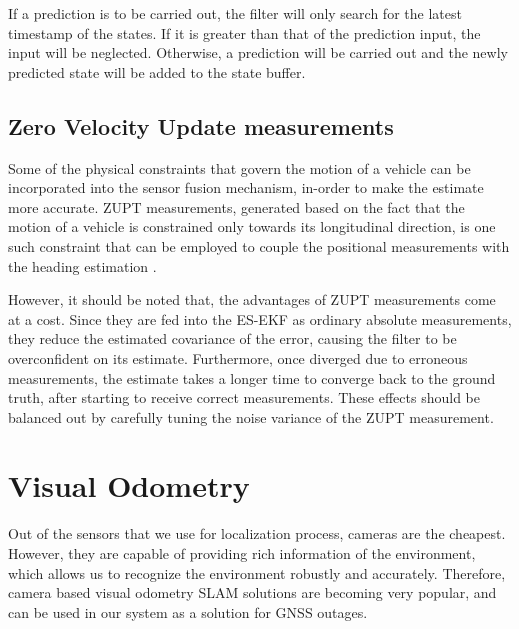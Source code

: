 If a prediction is to be carried out, the filter will only search for the latest timestamp of the states. If it is greater than that of the prediction input, the input will be neglected. Otherwise, a prediction will be carried out and the newly predicted state will be added to the state buffer.



\subsection{Zero Velocity Update measurements}
Some of the physical constraints that govern the motion of a vehicle can be incorporated into the sensor fusion mechanism, in-order to make the estimate more accurate. \gls{ZUPT} measurements, generated based on the fact that the motion of a vehicle is constrained only towards its longitudinal direction, is one such constraint that can be employed to couple the positional measurements with the heading estimation \cite{pa:Dissanayake2001ZUPT}. 

However, it should be noted that, the advantages of \gls{ZUPT} measurements come at a cost. Since they are fed into the \gls{ES-EKF} as ordinary absolute measurements, they reduce the estimated covariance of the error, causing the filter to be overconfident on its estimate. Furthermore, once diverged due to erroneous measurements, the estimate takes a longer time to converge back to the ground truth, after starting to receive correct measurements. These effects should be balanced out by carefully tuning the noise variance of the \gls{ZUPT} measurement.







\section{Visual Odometry}
Out of the sensors that we use for localization process, cameras are the cheapest. However, they are capable of providing rich information of the environment, which allows us to recognize the environment robustly and accurately. Therefore, camera based visual odometry \gls{SLAM} solutions are becoming very popular, and can be used in our system as a solution for \gls{GNSS} outages. 

